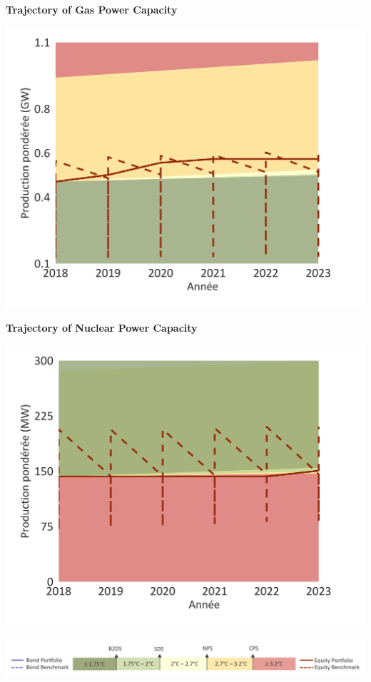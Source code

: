 \documentclass[10pt,table]{article}\usepackage[]{graphicx}\usepackage[]{color}
\begin{document}
	\begin{minipage}[t]{.49\textwidth}
		\textbf{Trajectory of Gas Power Capacity }

		\includegraphics[trim = {0 0cm 0 0},width=1\linewidth]{ReportOutputs/Fig19}

		\textbf{Trajectory of Nuclear Power Capacity }

		\includegraphics[trim = {0 0cm 0 0},width=1\linewidth]{ReportOutputs/Fig20}

	\end{minipage}

	\vspace{-0.6cm}
	\begin{center}
		\includegraphics[trim = {0 0cm 0 0},width=.9\linewidth]{ReportGraphics/246Legend.png}
	\end{center}
\end{document}
